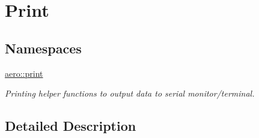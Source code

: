 \hypertarget{group__print}{}\section{Print}
\label{group__print}
\subsection*{Namespaces}
\begin{DoxyCompactItemize}
\item 
 \hyperlink{namespaceaero_1_1print}{aero\+::print}
\begin{DoxyCompactList}\small\item\em Printing helper functions to output data to serial monitor/terminal. \end{DoxyCompactList}\end{DoxyCompactItemize}


\subsection{Detailed Description}
